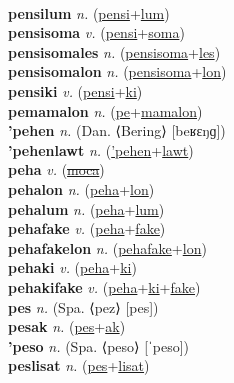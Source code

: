  \label{pensilial} \\
\textbf{pensilum} \textit{n.} (\hyperref[pensi]{pensi}+\hyperref[lum]{lum})
 \label{pensilum} \\
\textbf{pensisoma} \textit{v.} (\hyperref[pensi]{pensi}+\hyperref[soma]{soma})
 \label{pensisoma} \\
\textbf{pensisomales} \textit{n.} (\hyperref[pensisoma]{pensisoma}+\hyperref[les]{les})
 \label{pensisomales} \\
\textbf{pensisomalon} \textit{n.} (\hyperref[pensisoma]{pensisoma}+\hyperref[lon]{lon})
 \label{pensisomalon} \\
\textbf{pensiki} \textit{v.} (\hyperref[pensi]{pensi}+\hyperref[ki]{ki})
 \label{pensiki} \\
\textbf{pemamalon} \textit{n.} (\hyperref[pe]{pe}+\hyperref[mamalon]{mamalon})
 \label{pemamalon} \\
\textbf{'pehen} \textit{n.} (Dan. ⟨Bering⟩ [beʁɛŋɡ])
 \label{'pehen} \\
\textbf{'pehenlawt} \textit{n.} (\hyperref['pehen]{'pehen}+\hyperref[lawt]{lawt})
 \label{'pehenlawt} \\
\textbf{peha} \textit{v.} (\hyperref[moca]{\sout{moca}})
 \label{peha} \\
\textbf{pehalon} \textit{n.} (\hyperref[peha]{peha}+\hyperref[lon]{lon})
 \label{pehalon} \\
\textbf{pehalum} \textit{n.} (\hyperref[peha]{peha}+\hyperref[lum]{lum})
 \label{pehalum} \\
\textbf{pehafake} \textit{v.} (\hyperref[peha]{peha}+\hyperref[fake]{fake})
 \label{pehafake} \\
\textbf{pehafakelon} \textit{n.} (\hyperref[pehafake]{pehafake}+\hyperref[lon]{lon})
 \label{pehafakelon} \\
\textbf{pehaki} \textit{v.} (\hyperref[peha]{peha}+\hyperref[ki]{ki})
 \label{pehaki} \\
\textbf{pehakifake} \textit{v.} (\hyperref[peha]{peha}+\hyperref[ki]{ki}+\hyperref[fake]{fake})
 \label{pehakifake} \\
\textbf{pes} \textit{n.} (Spa. ⟨pez⟩ [pes])
 \label{pes} \\
\textbf{pesak} \textit{n.} (\hyperref[pes]{pes}+\hyperref[ak]{ak})
 \label{pesak} \\
\textbf{'peso} \textit{n.} (Spa. ⟨peso⟩ [ˈpeso])
 \label{'peso} \\
\textbf{peslisat} \textit{n.} (\hyperref[pes]{pes}+\hyperref[lisat]{lisat})
 \label{peslisat} \\
